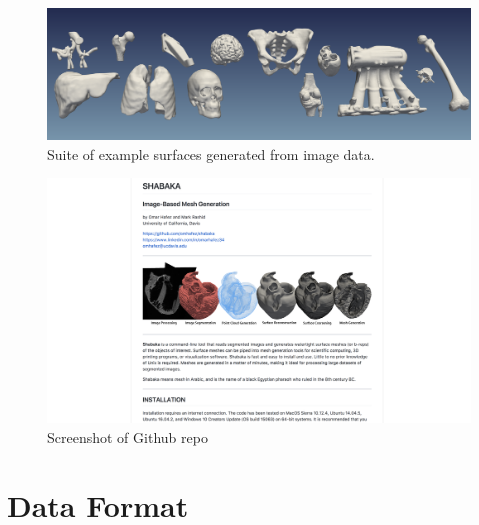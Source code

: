 \begin{figure}[ht!]
\centering
\vspace{2.5mm}
\includegraphics[width=1.0\textwidth]{media/2-shabaka/2-surf/6-showcase.png}
\caption{Suite of example surfaces generated from image data.}
\label{fig:showcase}
\end{figure}

\begin{figure}[ht!]
\centering
\vspace{2.5mm}
\includegraphics[width=1.0\textwidth]{media/2-shabaka/2-surf/7-shabaka.png}
\caption{Screenshot of Github repo}
\label{fig:github}
\end{figure}

\section{Data Format}
\label{Data Format}